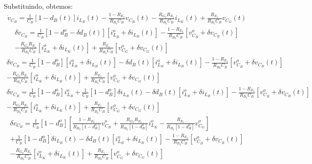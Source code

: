\documentclass{article}
\begin{document}
Substituindo, obtemos:
\begin{gather*}
  \dot{v}_{C_B} = \frac{1}{C_B} \left[1 - d_B(t)\right] i_{L_B}(t) - \frac{1 - R_{E_2}}{R_{B_2}C_B} v_{C_B}(t) - \frac{R_{G_2} R_{E_1}}{R_{B_2} C_B} i_{L_K}(t) + \frac{R_{E_1}}{R_{B_2} C_B} v_{C_G}(t)
\end{gather*}
\begin{multline*}
  \delta \dot{v}_{C_B} = \frac{1}{C_B} \left[1 - d_B^o - \delta d_B(t)\right] \left[i_{L_B}^o + \delta i_{L_B}(t) \right]
  - \frac{1 - R_{E_2}}{R_{B_2}C_B} \left[v_{C_B}^o + \delta v_{C_B}(t)\right] \\
  - \frac{R_{G_2} R_{E_1}}{R_{B_2} C_B} \left[i_{L_K}^o + \delta i_{L_K}(t)\right]
  + \frac{R_{E_1}}{R_{B_2} C_B} \left[v_{C_G}^o + \delta v_{C_G}(t)\right]
\end{multline*}
\begin{multline*}
  \delta \dot{v}_{C_B} = \frac{1}{C_B} \left[1 - d_B^o\right] \left[i_{L_B}^o + \delta i_{L_B}(t) \right]
  - \delta d_B(t) \left[i_{L_B}^o + \delta i_{L_B}(t) \right]
  - \frac{1 - R_{E_2}}{R_{B_2}C_B} \left[v_{C_B}^o + \delta v_{C_B}(t)\right] \\
  - \frac{R_{G_2} R_{E_1}}{R_{B_2} C_B} \left[i_{L_K}^o + \delta i_{L_K}(t)\right]
  + \frac{R_{E_1}}{R_{B_2} C_B} \left[v_{C_G}^o + \delta v_{C_G}(t)\right]
\end{multline*}
\begin{multline*}
  \delta \dot{v}_{C_B} = \frac{1}{C_B} \left[1 - d_B^o\right] i_{L_B}^o + \frac{1}{C_B} \left[1 - d_B^o\right] \delta i_{L_B}(t)
  - \delta d_B(t) \left[i_{L_B}^o + \delta i_{L_B}(t) \right]
  - \frac{1 - R_{E_2}}{R_{B_2}C_B} \left[v_{C_B}^o + \delta v_{C_B}(t)\right] \\
  - \frac{R_{G_2} R_{E_1}}{R_{B_2} C_B} \left[i_{L_K}^o + \delta i_{L_K}(t)\right]
  + \frac{R_{E_1}}{R_{B_2} C_B} \left[v_{C_G}^o + \delta v_{C_G}(t)\right]
\end{multline*}
\begin{multline*}
  \delta \dot{v}_{C_B} = \frac{1}{C_B} \left[1 - d_B^o\right] \left[\frac{1 - R_{E_2}}{R_{B_2} \left[1 - d_B^o\right]} v_{C_B}^o + \frac{R_{G_2} R_{E_1}}{R_{B_2} \left[1 - d_B^o\right]} i_{L_K}^o - \frac{R_{E_1}}{R_{B_2} \left[1 - d_B^o\right]} v_{C_G}^o\right] \\
  + \frac{1}{C_B} \left[1 - d_B^o\right] \delta i_{L_B}(t)
  - \delta d_B(t) \left[i_{L_B}^o + \delta i_{L_B}(t) \right]
  - \frac{1 - R_{E_2}}{R_{B_2}C_B} \left[v_{C_B}^o + \delta v_{C_B}(t)\right] \\
  - \frac{R_{G_2} R_{E_1}}{R_{B_2} C_B} \left[i_{L_K}^o + \delta i_{L_K}(t)\right]
  + \frac{R_{E_1}}{R_{B_2} C_B} \left[v_{C_G}^o + \delta v_{C_G}(t)\right]
\end{multline*}
\end{document}
